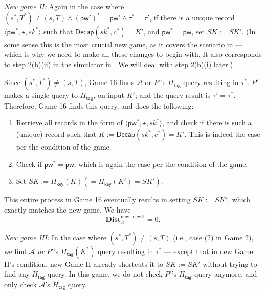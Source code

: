 \documentclass{article}
\theoremstyle{plain}
\theoremstyle{definition}
\theoremstyle{remark}
\newcommand{\adv}{\mathcal{A}}
\newcommand{\env}{\mathcal{Z}}
\newcommand{\Dist}{\mathbf{Dist}}
\newcommand{\Decap}{\mathsf{Decap}}
\newcommand{\Hkey}{H_\mathsf{key}}
\newcommand{\Htag}{H_\mathsf{tag}}
\newcommand{\pw}{\mathsf{pw}}
\begin{document}
\medskip\noindent\emph{New game II:} Again in the case where $(s^*,T^*) \neq (s,T) \land (\pw')^* = \pw' \land \tau^* = \tau'$, if there is a unique record $\langle\pw^*,\star,sk^*\rangle$ such that $\Decap(sk^*,c^*) = K'$, and $\pw^* = \pw$, set $SK := SK'$. (In some sense this is the most crucial new game, as it covers the scenario in  --- which is why we need to make all these changes to begin with. It also corresponds to step 2(b)(ii) in the simulator in . We will deal with step 2(b)(i) later.)

Since $(s^*,T^*) \neq (s,T)$, Game 16 finds $\adv$ or $P'$'s $\Htag$ query resulting in $\tau^*$. $P'$ makes a single query to $\Htag$, on input $K'$; and the query result is $\tau' = \tau^*$. Therefore, Game 16 finds this query, and does the following:
\begin{enumerate}
  \item Retrieve all records in the form of $\langle\pw^*,\star,sk^*\rangle$, and check if there is such a (unique) record such that $K := \Decap(sk^*,c^*) = K'$. This is indeed the case per the condition of the game.
  \item Check if $\pw^* = \pw$, which is again the case per the condition of the game.
  \item Set $SK := \Hkey(K) (= \Hkey(K') = SK')$.
\end{enumerate}
This entire process in Game 16 eventually results in setting $SK := SK'$, which exactly matches the new game. We have
\[
\Dist_\env^{\text{newI},\text{newII}} = 0.
\]

\noindent\emph{New game III:} In the case where $(s^*,T^*) \neq (s,T) $ (i.e., case (2) in Game 2), we find $\adv$ \emph{or $P'$}'s $\Htag(K^*)$ query resulting in $\tau^*$ --- except that in new Game II's condition, new Game II already shortcuts it to $SK := SK'$ without trying to find any $\Htag$ query. In this game, we do not check $P'$'s $\Htag$ query anymore, and only check $\adv$'s $\Htag$ query.
\end{document}
